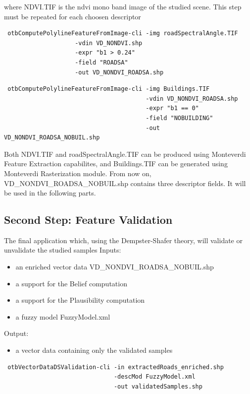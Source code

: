 where NDVI.TIF is the ndvi mono band image of the studied scene.
This step must be repeated for each choosen descriptor

\begin{verbatim}
 otbComputePolylineFeatureFromImage-cli -img roadSpectralAngle.TIF  
					-vdin VD_NONDVI.shp 
					-expr "b1 > 0.24" 
					-field "ROADSA" 
					-out VD_NONDVI_ROADSA.shp
\end{verbatim}

\begin{verbatim}
 otbComputePolylineFeatureFromImage-cli -img Buildings.TIF 
                                        -vdin VD_NONDVI_ROADSA.shp 
                                        -expr "b1 == 0" 
                                        -field "NOBUILDING" 
                                        -out VD_NONDVI_ROADSA_NOBUIL.shp
\end{verbatim}

Both NDVI.TIF and roadSpectralAngle.TIF can be produced using Monteverdi Feature Extraction capabilites, and Buildings.TIF can be generated using Monteverdi Rasterization module.
From now on, VD_NONDVI_ROADSA_NOBUIL.shp contains three descriptor fields. It will be used in the following parts.

\subsection{Second Step: Feature Validation}

The final application which, using the Dempster-Shafer theory, will validate or unvalidate the studied samples
Inputs:
\begin{itemize}
\item an enriched vector data VD_NONDVI_ROADSA_NOBUIL.shp
\item a support for the Belief computation
\item a support for the Plausibility computation
\item a fuzzy model FuzzyModel.xml
\end{itemize}
Output:
\begin{itemize}
\item a vector data containing only the validated samples
\end{itemize}
\begin{verbatim}
 otbVectorDataDSValidation-cli -in extractedRoads_enriched.shp 
                               -descMod FuzzyModel.xml 
                               -out validatedSamples.shp
\end{verbatim}

